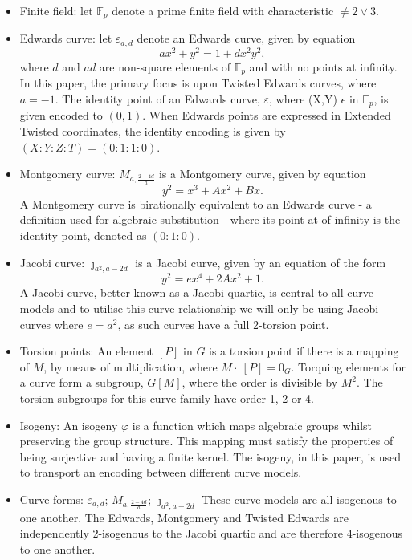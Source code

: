 \documentclass{article}
\newcommand{\Fp}{\ensuremath{\mathbb{F}_p}}
\theoremstyle{definition}
\theoremstyle{remark}
\begin{document}
	\begin{itemize}
		
		\item Finite field: let \Fp{ }denote a prime finite field with characteristic $\neq {2}\vee{3}$.
		
		\item Edwards curve: let $\varepsilon_{a,d}$ denote an Edwards curve, given by equation 
		$$ {a}x^2+y^2=1+{d}x^2y^2, $$ 
		where {$d$} and {$ad$} are non-square elements of $\Fp$ and with no points at infinity. %
		In this paper, the primary focus is upon Twisted Edwards curves, where $a = -1$. 
		The identity point of an Edwards curve, $\varepsilon$, where (X,Y) $\epsilon$ in \Fp, is given encoded to $(0,1)$. When Edwards points are expressed in Extended Twisted coordinates, the identity encoding is given by $(X : Y : Z : T) = (0 : 1 : 1 : 0)$.
		
		\item Montgomery curve: ${M}_{a,\frac{2-4d}{a}}$ is a Montgomery curve, given by equation
		$$y^2=x^3+Ax^2+Bx.$$ 
		A Montgomery curve is birationally equivalent to an Edwards curve - a definition used for algebraic substitution -  where its point at of infinity is the identity point, denoted as $(0 : 1 : 0)$.
		
		\item Jacobi curve: $\jmath_{a^{2},a-{2d}}$ is a Jacobi curve, given by an equation of the form 
		$$y^2 = {e}x^4 + 2Ax^2 + 1.$$ 
		A Jacobi curve, better known as a Jacobi quartic, is central to all curve models and to utilise this curve relationship we will only be using Jacobi curves where $e = {a}^2$, as such curves have a full 2-torsion point.
		
		\item Torsion points: An element $[P]$ in $G$ is a torsion point if there is a mapping of $M$, by means of multiplication, where $M \cdot\ [P] = 0_{G}$. Torquing elements for a curve form a subgroup, $G[M]$, where the order is divisible by ${M}^2$. The torsion subgroups for this curve family have order 1, 2 or 4.
		
		\item Isogeny: An isogeny $\varphi$ is a function which maps algebraic groups whilst preserving the group structure. This mapping must satisfy the properties of being surjective and having a finite kernel. The isogeny, in this paper, is used to transport an encoding between different curve models.
		
		\item Curve forms: $\varepsilon_{a,d}$; ${M}_{a,\frac{2-4d}{a}}$; $\jmath_{a^{2},a-{2d}}$ These curve models are all isogenous to one another. The Edwards, Montgomery and Twisted Edwards are independently 2-isogenous to the Jacobi quartic and are therefore 4-isogenous to one another. 
		

\end{itemize}
\end{document}
